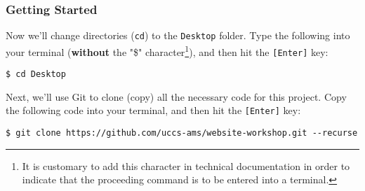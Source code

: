 \begin{frame}[fragile]
    \frametitle{Getting Started}

    Now we'll change directories (\texttt{cd}) to the \texttt{Desktop} folder.  Type the following into your terminal
    (\textbf{without} the "\$" character\footnote{
        It is customary to add this character in technical documentation in order to indicate that the proceeding
        command is to be entered into a terminal.
    }), and then hit the \texttt{[Enter]} key:
   
    \bigskip
    
    \begin{lstlisting}[style=saneCode,gobble=8]
        $ cd Desktop
    \end{lstlisting}

    \vfill
    Next, we'll use Git to clone (copy) all the necessary code for this project. Copy the following code into your 
    terminal, and then hit the \texttt{[Enter]} key:

    \bigskip

    \begin{lstlisting}[style=saneCode,gobble=8]
        $ git clone https://github.com/uccs-ams/website-workshop.git --recurse
    \end{lstlisting}


\end{frame}